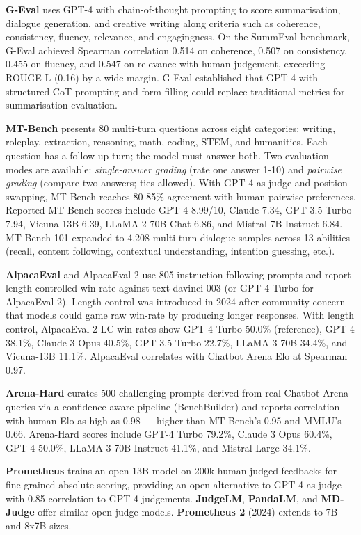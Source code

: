 \documentclass{article}
\begin{document}
\textbf{G-Eval} \cite{liu2023gevalnlgevaluation} uses GPT-4 with chain-of-thought prompting to score summarisation, dialogue generation, and creative writing along criteria such as coherence, consistency, fluency, relevance, and engagingness. On the SummEval benchmark, G-Eval achieved Spearman correlation 0.514 on coherence, 0.507 on consistency, 0.455 on fluency, and 0.547 on relevance with human judgement, exceeding ROUGE-L (0.16) by a wide margin. G-Eval established that GPT-4 with structured CoT prompting and form-filling could replace traditional metrics for summarisation evaluation.

\textbf{MT-Bench} \cite{zheng20232023} presents 80 multi-turn questions across eight categories: writing, roleplay, extraction, reasoning, math, coding, STEM, and humanities. Each question has a follow-up turn; the model must answer both. Two evaluation modes are available: \emph{single-answer grading} (rate one answer 1-10) and \emph{pairwise grading} (compare two answers; ties allowed). With GPT-4 as judge and position swapping, MT-Bench reaches 80-85\% agreement with human pairwise preferences. Reported MT-Bench scores include GPT-4 8.99/10, Claude 7.34, GPT-3.5 Turbo 7.94, Vicuna-13B 6.39, LLaMA-2-70B-Chat 6.86, and Mistral-7B-Instruct 6.84. MT-Bench-101 \cite{bai20242024} expanded to 4,208 multi-turn dialogue samples across 13 abilities (recall, content following, contextual understanding, intention guessing, etc.).

\textbf{AlpacaEval} \cite{dubois20242024} and AlpacaEval 2 use 805 instruction-following prompts and report length-controlled win-rate against text-davinci-003 (or GPT-4 Turbo for AlpacaEval 2). Length control was introduced in 2024 after community concern that models could game raw win-rate by producing longer responses. With length control, AlpacaEval 2 LC win-rates show GPT-4 Turbo 50.0\% (reference), GPT-4 38.1\%, Claude 3 Opus 40.5\%, GPT-3.5 Turbo 22.7\%, LLaMA-3-70B 34.4\%, and Vicuna-13B 11.1\%. AlpacaEval correlates with Chatbot Arena Elo at Spearman 0.97.

\textbf{Arena-Hard} \cite{li20242024} curates 500 challenging prompts derived from real Chatbot Arena queries via a confidence-aware pipeline (BenchBuilder) and reports correlation with human Elo as high as 0.98 --- higher than MT-Bench's 0.95 and MMLU's 0.66. Arena-Hard scores include GPT-4 Turbo 79.2\%, Claude 3 Opus 60.4\%, GPT-4 50.0\%, LLaMA-3-70B-Instruct 41.1\%, and Mistral Large 34.1\%.

\textbf{Prometheus} \citep{kim2025beyondneedlesinthe} trains an open 13B model on 200k human-judged feedbacks for fine-grained absolute scoring, providing an open alternative to GPT-4 as judge with 0.85 correlation to GPT-4 judgements. \textbf{JudgeLM}, \textbf{PandaLM}, and \textbf{MD-Judge} offer similar open-judge models. \textbf{Prometheus 2} (2024) extends to 7B and 8x7B sizes.
\end{document}
